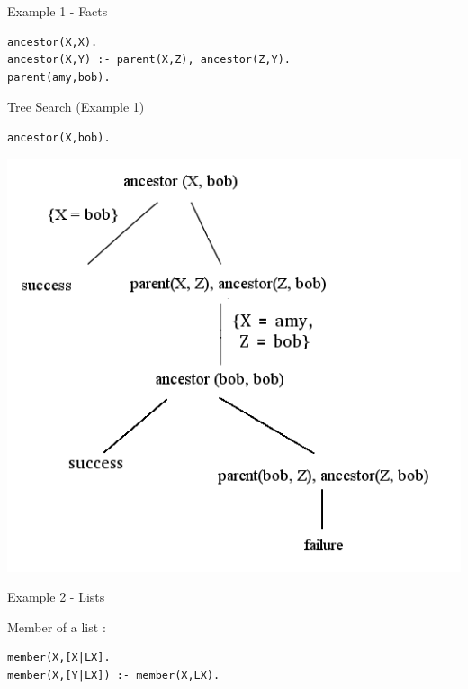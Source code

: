 \documentclass[11pt]{beamer}
\begin{document}
\begin{frame}[fragile]{Example 1 - Facts}

\begin{lstlisting}
ancestor(X,X).
ancestor(X,Y) :- parent(X,Z), ancestor(Z,Y).
parent(amy,bob).
\end{lstlisting}

\end{frame}

\begin{frame}[fragile]{Tree Search (Example 1)}

	\begin{lstlisting}[xleftmargin=.27\textwidth]
ancestor(X,bob).
\end{lstlisting}

\begin{center}

\includegraphics[scale=0.5]{resolution_1.png}
\end{center}

\end{frame}

\begin{frame}[fragile]{Example 2 - Lists}

	Member of a list :
	\begin{lstlisting}
member(X,[X|LX].
member(X,[Y|LX]) :- member(X,LX).
\end{lstlisting}

\end{frame}
\end{document}
